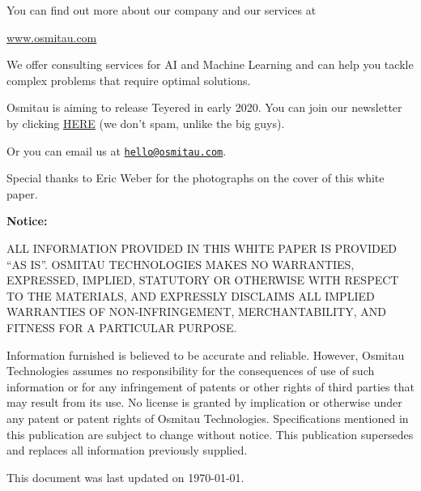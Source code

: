 \documentclass[12pt]{extarticle}
\begin{document}
You can find out more about our company and our services at
\newline 
\newline 
\centerline{\url{www.osmitau.com}}
\newline 
\newline 
We offer consulting services for AI and Machine
Learning and can help you tackle complex problems that require optimal
solutions.

Osmitau is aiming to release Teyered in early 2020. You can join our newsletter by clicking \href{http://eepurl.com/gO-J9n}{HERE} (we don't spam, unlike the big guys).

Or you can email us at \href{mailto:hello@osmitau.com}{\nolinkurl{hello@osmitau.com}}.
\newpage





\newpage

Special thanks to Eric Weber for the photographs on the cover of this
white paper.

\vspace*{\fill}
\textbf{Notice:}  

ALL INFORMATION PROVIDED IN THIS WHITE PAPER IS PROVIDED ``AS
IS''. OSMITAU TECHNOLOGIES MAKES NO WARRANTIES, EXPRESSED, IMPLIED,
STATUTORY OR OTHERWISE WITH RESPECT TO THE MATERIALS, AND EXPRESSLY
DISCLAIMS ALL IMPLIED WARRANTIES OF NON-INFRINGEMENT, MERCHANTABILITY,
AND FITNESS FOR A PARTICULAR PURPOSE.


Information furnished is believed to be accurate and reliable. However,
Osmitau Technologies assumes no responsibility for the consequences of
use of such information or for any infringement of patents or other
rights of third parties that may result from its use. No license is
granted by implication or otherwise under any patent or patent rights of
Osmitau Technologies. Specifications mentioned in this publication are
subject to change without notice. This publication supersedes and
replaces all information previously supplied.

This document was last updated on \today.

\newpage
\end{document}
